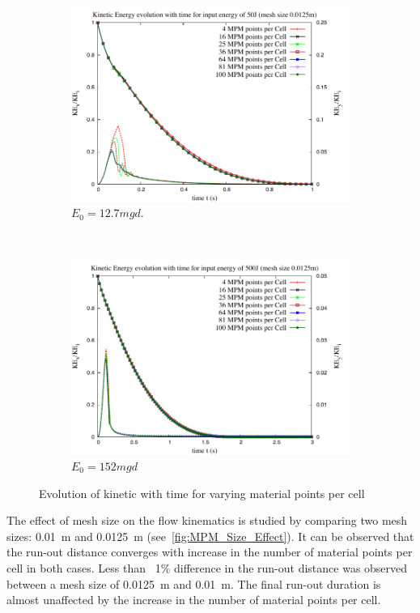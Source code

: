 \begin{figure}[tbhp]
\centering
\begin{subfigure}[b]{0.95\textwidth}
\includegraphics[width=\textwidth]{KE_50}
\caption{$E_0=12.7mgd$.}
\label{fig:KE_50}
\end{subfigure}
\\
\begin{subfigure}[b]{0.95\textwidth}
\centering
\includegraphics[width=\textwidth]{KE_500}
\caption{$E_0=152mgd$}
\label{fig:KE_500}
\end{subfigure}
\caption{Evolution of kinetic with time for varying material points per cell}
\label{fig:KE_MPM}
\end{figure}

The effect of mesh size on the flow kinematics is studied by comparing two mesh 
sizes: 0.01~\si{\m} and 0.0125~\si{\m} (see~\cref{fig:MPM_Size_Effect}). It can 
be observed that the run-out distance converges with increase in the number of 
material points per cell in both cases. Less than ~1\% difference in the 
run-out distance was observed between a mesh size of 0.0125~\si{\m} and 
0.01~\si{\m}. The final run-out duration is almost unaffected by the increase 
in the number of material points per cell. 
 

